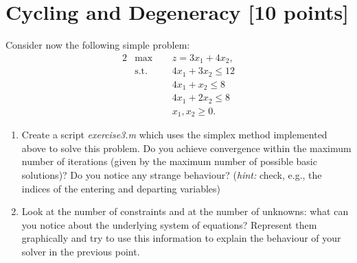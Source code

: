 \documentclass[unicode,11pt,a4paper,oneside,numbers=endperiod,openany]{scrartcl}
\begin{document}
\section{Cycling and Degeneracy [10 points]}

Consider now the following simple problem:
\begin{alignat*}{2}
	&\text{max}\;\, && z = 3x_1+4x_2,\\
	&\text{s.t.} && 4x_1+3x_2\leq 12\\
	& && 4x_1+x_2\leq 8\\
	& && 4x_1+2x_2\leq 8\\
	& && x_1, x_2 \geq 0.
\end{alignat*}

\begin{enumerate}
	\item Create a script \emph{exercise3.m} which uses the simplex method implemented above to solve this problem. Do you achieve convergence within the maximum number of iterations (given by the maximum number of possible basic solutions)? Do you notice any strange behaviour? (\emph{hint:} check, e.g., the indices of the entering and departing variables)
	\item Look at the number of constraints and at the number of unknowns: what can you notice about the underlying system of equations? Represent them graphically and try to use this information to explain the behaviour of your solver in the previous point. 
\end{enumerate}
\end{document}
